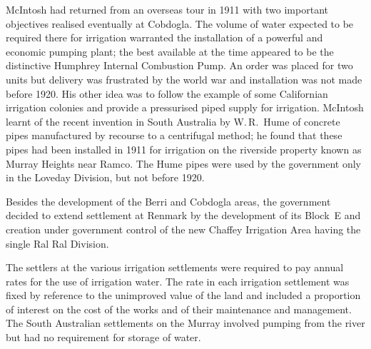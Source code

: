 McIntosh had returned from an overseas tour in 1911 with two important
objectives realised eventually at Cobdogla.  The volume of water
expected to be required there for irrigation warranted the
installation of a powerful and economic pumping plant; the best
available at the time appeared to be the distinctive Humphrey Internal
Combustion Pump.  An order was placed for two
units but delivery was frustrated by the world war and installation
was not made before 1920.  His other idea was to follow the example of
some Californian irrigation colonies and provide a pressurised piped
supply for irrigation.  McIntosh learnt of the recent invention in
South Australia by W.\,R.~Hume  of concrete pipes
manufactured by recourse to a centrifugal method; he found that these
pipes had been installed in 1911 for irrigation on the riverside
property known as Murray Heights near Ramco.  The Hume pipes
 were used by the government only in the Loveday
Division, but not before 1920.

Besides the development of the Berri and Cobdogla areas, the
government decided to extend settlement at Renmark by the development
of its Block~E and creation under government control of the new
Chaffey Irrigation Area  having the
single Ral Ral Division.

The settlers at the various irrigation settlements were required to
pay annual rates for the use of irrigation water.  The rate in each
irrigation settlement was fixed by reference to the unimproved value
of the land and included a proportion of interest on the cost of the
works and of their maintenance and
management. 
The South Australian settlements on the Murray involved pumping from
the river but had no requirement for storage of water.

